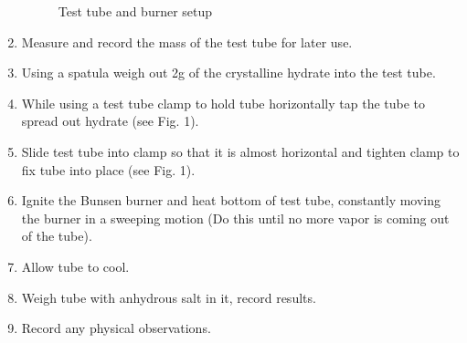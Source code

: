 \documentclass[12pt]{article}
\begin{document}
\begin{enumerate}
\begin{figure}[h]
			      	\caption{Test tube and burner setup}
			      \end{figure}
			\item Measure and record the mass of the test tube for later use.
			\item Using a spatula weigh out 2g of the crystalline hydrate into the test tube.
			\item While using a test tube clamp to hold tube horizontally tap the tube to spread out hydrate (see Fig. 1).
			\item Slide test tube into clamp so that it is almost horizontal and tighten clamp to fix tube into place (see Fig. 1).
			\item Ignite the Bunsen burner and heat bottom of test tube, constantly moving the burner in a sweeping motion (Do this until no more vapor is coming out of the tube).
			\item Allow tube to cool.
			\item Weigh tube with anhydrous salt in it, record results.
			\item Record any physical observations.
		\end{enumerate}
		\newpage
\end{document}
